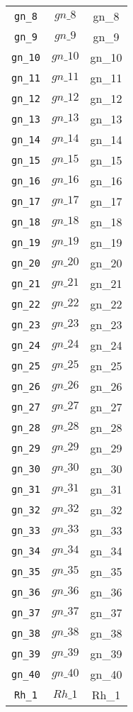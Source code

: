 \begin{center}
\begin{longtable}{ccc}
\texttt{gn\_8} & $gn\_8$ & gn\_8\\
\texttt{gn\_9} & $gn\_9$ & gn\_9\\
\texttt{gn\_10} & $gn\_10$ & gn\_10\\
\texttt{gn\_11} & $gn\_11$ & gn\_11\\
\texttt{gn\_12} & $gn\_12$ & gn\_12\\
\texttt{gn\_13} & $gn\_13$ & gn\_13\\
\texttt{gn\_14} & $gn\_14$ & gn\_14\\
\texttt{gn\_15} & $gn\_15$ & gn\_15\\
\texttt{gn\_16} & $gn\_16$ & gn\_16\\
\texttt{gn\_17} & $gn\_17$ & gn\_17\\
\texttt{gn\_18} & $gn\_18$ & gn\_18\\
\texttt{gn\_19} & $gn\_19$ & gn\_19\\
\texttt{gn\_20} & $gn\_20$ & gn\_20\\
\texttt{gn\_21} & $gn\_21$ & gn\_21\\
\texttt{gn\_22} & $gn\_22$ & gn\_22\\
\texttt{gn\_23} & $gn\_23$ & gn\_23\\
\texttt{gn\_24} & $gn\_24$ & gn\_24\\
\texttt{gn\_25} & $gn\_25$ & gn\_25\\
\texttt{gn\_26} & $gn\_26$ & gn\_26\\
\texttt{gn\_27} & $gn\_27$ & gn\_27\\
\texttt{gn\_28} & $gn\_28$ & gn\_28\\
\texttt{gn\_29} & $gn\_29$ & gn\_29\\
\texttt{gn\_30} & $gn\_30$ & gn\_30\\
\texttt{gn\_31} & $gn\_31$ & gn\_31\\
\texttt{gn\_32} & $gn\_32$ & gn\_32\\
\texttt{gn\_33} & $gn\_33$ & gn\_33\\
\texttt{gn\_34} & $gn\_34$ & gn\_34\\
\texttt{gn\_35} & $gn\_35$ & gn\_35\\
\texttt{gn\_36} & $gn\_36$ & gn\_36\\
\texttt{gn\_37} & $gn\_37$ & gn\_37\\
\texttt{gn\_38} & $gn\_38$ & gn\_38\\
\texttt{gn\_39} & $gn\_39$ & gn\_39\\
\texttt{gn\_40} & $gn\_40$ & gn\_40\\
\texttt{Rh\_1} & $Rh\_1$ & Rh\_1\\

\end{longtable}
\end{center}
